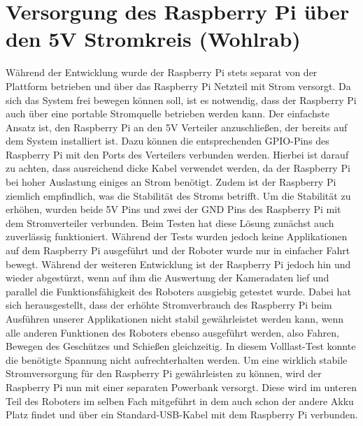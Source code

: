 \section{Versorgung des Raspberry Pi über den 5V Stromkreis (Wohlrab)}

Während der Entwicklung wurde der Raspberry Pi stets separat von der Plattform betrieben und über das Raspberry Pi Netzteil mit Strom versorgt.
Da sich das System frei bewegen können soll, ist es notwendig, dass der Raspberry Pi auch über eine portable Stromquelle betrieben werden kann.
Der einfachste Ansatz ist, den Raspberry Pi an den 5V Verteiler anzuschließen, der bereits auf dem System installiert ist.
Dazu können die entsprechenden GPIO-Pins des Raspberry Pi mit den Ports des Verteilers verbunden werden. 
Hierbei ist darauf zu achten, dass ausreichend dicke Kabel verwendet werden, da der Raspberry Pi bei hoher Auslastung einiges an Strom benötigt. 
Zudem ist der Raspberry Pi ziemlich empfindlich, was die Stabilität des Stroms betrifft. 
Um die Stabilität zu erhöhen, wurden beide 5V Pins und zwei der GND Pins des Raspberry Pi mit dem Stromverteiler verbunden.
Beim Testen hat diese Lösung zunächst auch zuverlässig funktioniert. 
Während der Tests wurden jedoch keine Applikationen auf dem Raspberry Pi ausgeführt und der Roboter wurde nur in einfacher Fahrt bewegt. 
Während der weiteren Entwicklung ist der Raspberry Pi jedoch hin und wieder abgestürzt, wenn auf ihm die Auswertung der Kameradaten lief und parallel die Funktionsfähigkeit des Roboters ausgiebig getestet wurde.
Dabei hat sich herausgestellt, dass der erhöhte Stromverbrauch des Raspberry Pi beim Ausführen unserer Applikationen nicht stabil gewährleistet werden kann, wenn alle anderen Funktionen des Roboters ebenso ausgeführt werden, also Fahren, Bewegen des Geschützes und Schießen gleichzeitig. 
In diesem Volllast-Test konnte die benötigte Spannung nicht aufrechterhalten werden.
Um eine wirklich stabile Stromversorgung für den Raspberry Pi gewährleisten zu können, wird der Raspberry Pi nun mit einer separaten Powerbank versorgt. 
Diese wird im unteren Teil des Roboters im selben Fach mitgeführt in dem auch schon der andere Akku Platz findet und über ein Standard-USB-Kabel mit dem Raspberry Pi verbunden.
